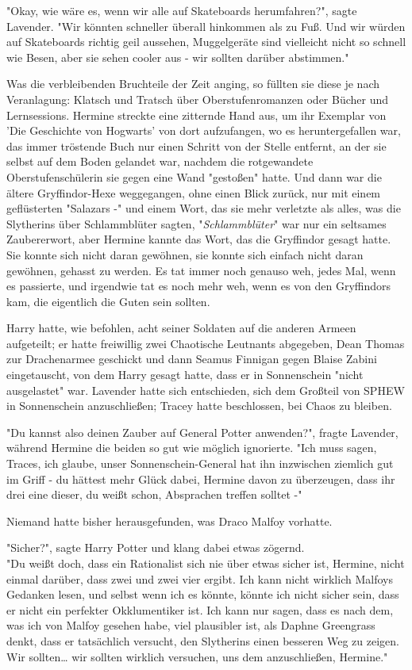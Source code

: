 {"Okay, wie wäre es, wenn wir alle auf Skateboards herumfahren?", sagte Lavender. "Wir könnten schneller überall hinkommen als zu Fuß. Und wir würden auf Skateboards richtig geil aussehen, Muggelgeräte sind vielleicht nicht so schnell wie Besen, aber sie sehen cooler aus - wir sollten darüber abstimmen."

Was die verbleibenden Bruchteile der Zeit anging, so füllten sie diese je nach Veranlagung: Klatsch und Tratsch über Oberstufenromanzen oder Bücher und Lernsessions. Hermine streckte eine zitternde Hand aus, um ihr Exemplar von 'Die Geschichte von Hogwarts' von dort aufzufangen, wo es heruntergefallen war, das immer tröstende Buch nur einen Schritt von der Stelle entfernt, an der sie selbst auf dem Boden gelandet war, nachdem die rotgewandete Oberstufenschülerin sie gegen eine Wand "gestoßen" hatte. Und dann war die ältere Gryffindor-Hexe weggegangen, ohne einen Blick zurück, nur mit einem geflüsterten "Salazars -" und einem Wort, das sie mehr verletzte als alles, was die Slytherins über Schlammblüter sagten, "\emph{Schlammblüter}" war nur ein seltsames Zaubererwort, aber Hermine kannte das Wort, das die Gryffindor gesagt hatte. Sie konnte sich nicht daran gewöhnen, sie konnte sich einfach nicht daran gewöhnen, gehasst zu werden. Es tat immer noch genauso weh, jedes Mal, wenn es passierte, und irgendwie tat es noch mehr weh, wenn es von den Gryffindors kam, die eigentlich die Guten sein sollten.

Harry hatte, wie befohlen, acht seiner Soldaten auf die anderen Armeen aufgeteilt; er hatte freiwillig zwei Chaotische Leutnants abgegeben, Dean Thomas zur Drachenarmee geschickt und dann Seamus Finnigan gegen Blaise Zabini eingetauscht, von dem Harry gesagt hatte, dass er in Sonnenschein "nicht ausgelastet" war. Lavender hatte sich entschieden, sich dem Großteil von SPHEW in Sonnenschein anzuschließen; Tracey hatte beschlossen, bei Chaos zu bleiben.

"Du kannst also deinen Zauber auf General Potter anwenden?", fragte Lavender, während Hermine die beiden so gut wie möglich ignorierte. "Ich muss sagen, Traces, ich glaube, unser Sonnenschein-General hat ihn inzwischen ziemlich gut im Griff - du hättest mehr Glück dabei, Hermine davon zu überzeugen, dass ihr drei eine dieser, du weißt schon, Absprachen treffen solltet -"

Niemand hatte bisher herausgefunden, was Draco Malfoy vorhatte.

"Sicher?", sagte Harry Potter und klang dabei etwas zögernd.\\ "Du weißt doch, dass ein Rationalist sich nie über etwas sicher ist, Hermine, nicht einmal darüber, dass zwei und zwei vier ergibt. Ich kann nicht wirklich Malfoys Gedanken lesen, und selbst wenn ich es könnte, könnte ich nicht sicher sein, dass er nicht ein perfekter Okklumentiker ist. Ich kann nur sagen, dass es nach dem, was ich von Malfoy gesehen habe, viel plausibler ist, als Daphne Greengrass denkt, dass er tatsächlich versucht, den Slytherins einen besseren Weg zu zeigen. Wir sollten… wir sollten wirklich versuchen, uns dem anzuschließen, Hermine."

}
